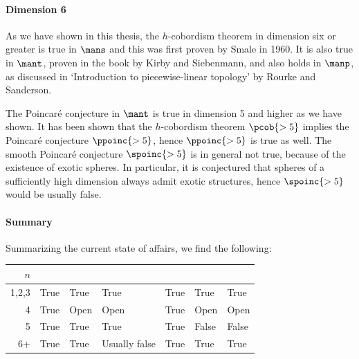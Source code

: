 
\paragraph{Dimension 6}

As we have shown in this thesis, the $h$-cobordism theorem in dimension six or greater is true in $\mans$ and this was first proven by Smale in 1960.
It is also true in $\mant$, proven in the book by Kirby and Siebenmann, and also holds in $\manp$, as discussed in `Introduction to piecewise-linear topology' by Rourke and Sanderson.

The Poincaré conjecture in $\mant$ is true in dimension 5 and higher as we have shown.
It has been shown that the $h$-cobordism theorem $\pcob{>5}$ implies the Poincaré conjecture $\ppoinc{>5}$, hence $\ppoinc{>5}$ is true as well.
The smooth Poincaré conjecture $\spoinc{>5}$ is in general not true, because of the existence of exotic spheres.
In particular, it is conjectured that spheres of a sufficiently high dimension always admit exotic structures, hence $\spoinc{>5}$ would be usually false.


\paragraph{Summary}
Summarizing the current state of affairs, we find the following:

\begin{center}
    \begin{tabular}{
            r
            >{\centering\arraybackslash}p{1.1cm}%
            >{\centering\arraybackslash}p{1.1cm}%
            >{\centering\arraybackslash}p{1.8cm}%
            >{\centering\arraybackslash}p{1.1cm}%
            >{\centering\arraybackslash}p{1.1cm}%
            >{\centering\arraybackslash}p{1.1cm}}
            $n$& \tpoinc{} & \ppoinc{} & \spoinc{} & \tcob{} & \pcob{} & \scob{}\\ \midrule
            1,2,3 &
            True & 
            True & 
            True &  
            True & 
            True & 
            True  \\
            4 &
            True & 
            Open & 
            Open&  
            True & 
            Open& 
            Open \\
            5 &
            True & 
            True & 
            True &  
            True & 
            False& 
            False \\
            6+ &
            True & 
            True & 
            Usually false&  
            True & 
            True& 
            True\\
    \end{tabular}
\end{center}
